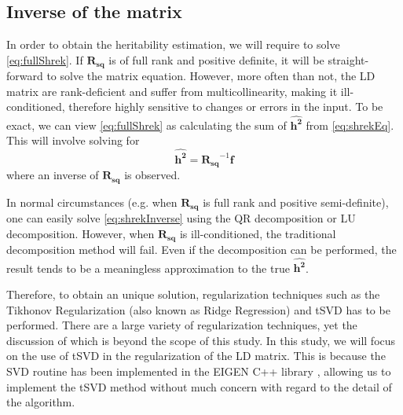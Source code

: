 		\subsection{Inverse of the  matrix}
			In order to obtain the heritability estimation, we will require to solve \cref{eq:fullShrek}. 
			If $\boldsymbol{R_{sq}}$ is of full rank and positive definite, it will be straight-forward to solve the matrix equation.
			However, more often than not, the \gls{LD} matrix are rank-deficient and suffer from multicollinearity, making it ill-conditioned, therefore highly sensitive to changes or errors in the input.
			To be exact, we can view \cref{eq:fullShrek} as calculating the sum of $\boldsymbol{\hat{h^2}}$ from  \cref{eq:shrekEq}.
			This will involve solving for
			\begin{equation}
			\boldsymbol{\hat{h^2}} = \boldsymbol{R_{sq}}^{-1}\boldsymbol{f}
			\label{eq:shrekInverse}
			\end{equation}
			where an inverse of $\boldsymbol{R_{sq}}$ is observed. 
			
			In normal circumstances (e.g. when $\boldsymbol{R_{sq}}$ is full rank and positive semi-definite), one can easily solve \cref{eq:shrekInverse} using the QR decomposition or LU decomposition.
			However, when $\boldsymbol{R_{sq}}$ is ill-conditioned, the traditional decomposition method will fail.
			Even if the decomposition can be performed, the result tends to be a meaningless approximation to the true $\boldsymbol{\hat{h^2}}$. 
			
			Therefore, to obtain an unique solution, regularization techniques such as the Tikhonov Regularization (also known as Ridge Regression) and \gls{tSVD} has to be performed\citep{Neumaier1998}. 
			There are a large variety of regularization techniques, yet the discussion of which is beyond the scope of this study. 
			In this study, we will focus on the use of \gls{tSVD} in the regularization of the \gls{LD} matrix.
			This is because the \gls{SVD} routine has been implemented in the EIGEN C++ library \citep{eigenweb}, allowing us to implement the \gls{tSVD} method without much concern with regard to the detail of the algorithm. 
			
